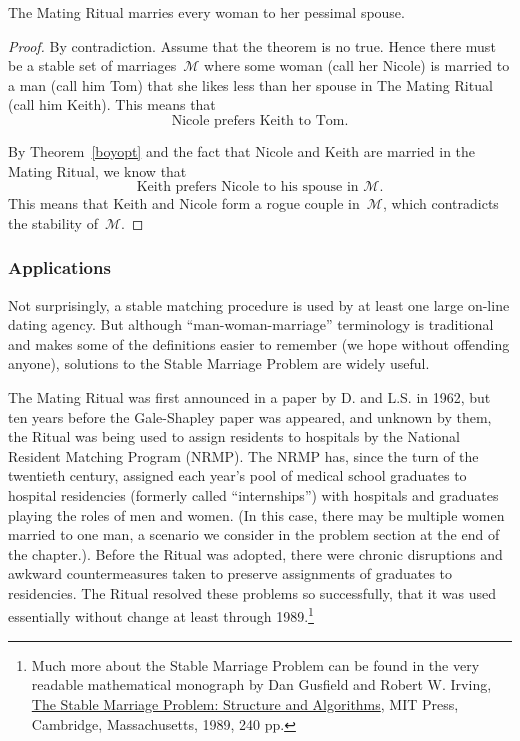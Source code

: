 \begin{theorem}
The Mating Ritual marries every woman to her pessimal spouse.
\end{theorem}

\begin{proof}
By contradiction.  Assume that the theorem is no true.  Hence there
must be a stable set of marriages~$\mathcal{M}$ where some woman (call
her Nicole) is married to a man (call him Tom) that she likes less
than her spouse in The Mating Ritual (call him Keith).  This means
that
\begin{equation}
\text{Nicole prefers Keith to Tom.} \tag{+}
\end{equation}

By Theorem~\ref{boyopt} and the fact that Nicole and Keith are married
in the Mating Ritual, we know that 
\begin{equation}\tag{++}
\text{Keith prefers Nicole to his spouse in~$\mathcal{M}$.}
\end{equation}
This means that Keith and Nicole form a rogue couple in~$\mathcal{M}$,
which contradicts the stability of~$\mathcal{M}$.
\end{proof}

\subsubsection{Applications}

Not surprisingly, a stable matching procedure is used by at least one
large on-line dating agency.  But although ``man-woman-marriage''
terminology is traditional and makes some of the definitions easier to
remember (we hope without offending anyone), solutions to the Stable
Marriage Problem are widely useful.

The Mating Ritual was first announced in a paper by D.  and
L.S.  in 1962, but ten years before the Gale-Shapley
paper was appeared, and unknown by them, the Ritual was being used to
assign residents to hospitals by the National Resident Matching
Program (NRMP).  The NRMP has, since the turn of the twentieth
century, assigned each year's pool of medical school graduates to
hospital residencies (formerly called ``internships'') with hospitals
and graduates playing the roles of men and women.  (In this case,
there may be multiple women married to one man, a scenario we consider
in the problem section at the end of the chapter.).  Before the Ritual
was adopted, there were chronic disruptions and awkward
countermeasures taken to preserve assignments of graduates to
residencies.  The Ritual resolved these problems so successfully, that
it was used essentially without change at least through
1989.\footnote{Much more about the Stable Marriage Problem can be
  found in the very readable mathematical monograph by Dan Gusfield
  and Robert W. Irving,
  \href{http://mitpress.mit.edu/catalog/item/default.asp?ttype=2&tid=7676}{The
    Stable Marriage Problem: Structure and Algorithms}, MIT Press,
  Cambridge, Massachusetts, 1989, 240 pp.}

